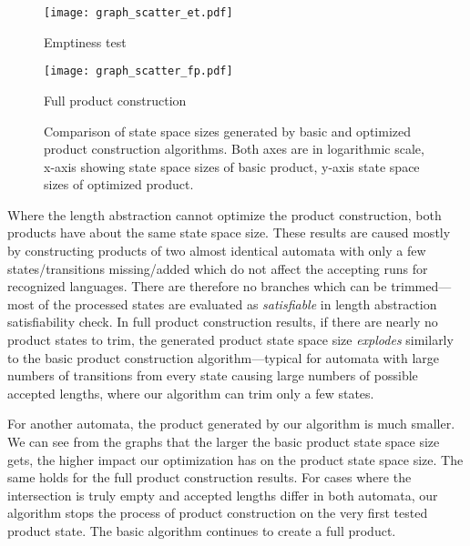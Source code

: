 \begin{figure*}[ht]
    \centering
    \begin{minipage}{0.49\linewidth}
        \centering
        \texttt{[image: graph\_scatter\_et.pdf]}
        \caption{Emptiness test}
        \label{fig:graph:et_state_space_sizes_comp}
    \end{minipage}
    \hfill
    \begin{minipage}{0.49\linewidth}
        \centering
        \texttt{[image: graph\_scatter\_fp.pdf]}
        \caption{Full product construction}
        \label{fig:graph:fp_state_space_sizes_comp}
    \end{minipage}
    \vspace{0.5cm}
    \caption{Comparison of state space sizes generated by basic and optimized product construction algorithms. Both axes are in logarithmic scale, x-axis showing state space sizes of basic product, y-axis state space sizes of optimized product.}
    \label{fig:graph:product_state_space_sizes}
\end{figure*}

Where the length abstraction cannot optimize the product construction, both products have about the same state space size. These results are caused mostly by constructing products of two almost identical automata with only a few states/transitions missing/added which do not affect the accepting runs for recognized languages. There are therefore no branches which can be trimmed---most of the processed states are evaluated as \emph{satisfiable} in length abstraction satisfiability check. In full product construction results, if there are nearly no product states to trim, the generated product state space size \emph{explodes} similarly to the basic product construction algorithm---typical for automata with large numbers of transitions from every state causing large numbers of possible accepted lengths, where our algorithm can trim only a few states.

For another automata, the product generated by our algorithm is much smaller. We can see from the graphs that the larger the basic product state space size gets, the higher impact our optimization has on the product state space size. The same holds for the full product construction results. For cases where the intersection is truly empty and accepted lengths differ in both automata, our algorithm stops the process of product construction on the very first tested product state. The basic algorithm continues to create a full product.

